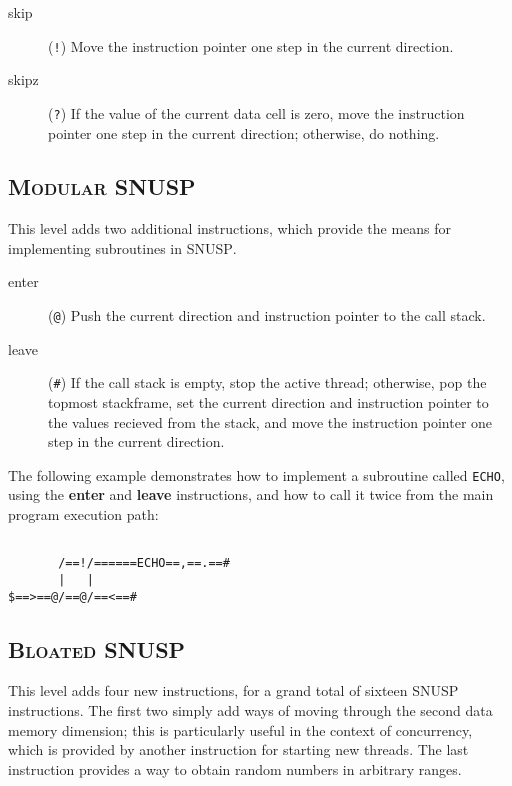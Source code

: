 \documentclass[a4paper]{article}
\begin{document}
\begin{description}
\item[skip] (\verb"!") Move the instruction pointer one step in the current
direction.

\item[skipz] (\verb"?") If the value of the current data cell is zero, move the
instruction pointer one step in the current direction; otherwise, do nothing.

\end{description}



\subsection{\textsc{Modular SNUSP}}

This level adds two additional instructions, which provide the means for
implementing subroutines in \textsc{SNUSP}.

\begin{description}

\item[enter] (\verb"@") Push the current direction and instruction pointer to
the call stack.

\item[leave] (\verb"#") If the call stack is empty, stop the active thread;
otherwise, pop the topmost stackframe, set the current direction and
instruction pointer to the values recieved from the stack, and move the
instruction pointer one step in the current direction.

\end{description}

The following example demonstrates how to implement a subroutine called
\verb"ECHO", using the \textbf{enter} and \textbf{leave} instructions, and how
to call it twice from the main program execution path:

\begin{verbatim}

       /==!/======ECHO==,==.==#
       |   |
$==>==@/==@/==<==#

\end{verbatim}



\subsection{\textsc{Bloated SNUSP}}

This level adds four new instructions, for a grand total of sixteen
\textsc{SNUSP} instructions.  The first two simply add ways of moving through
the second data memory dimension; this is particularly useful in the context
of concurrency, which is provided by another instruction for starting new
threads.  The last instruction provides a way to obtain random numbers in
arbitrary ranges.
\end{document}
